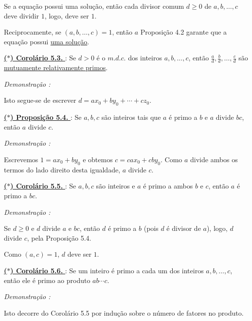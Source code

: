 Se a equação possui uma solução, então cada divisor comum $d \ge 0$ de $a, b, \ldots, c$ deve
dividir $1$, logo, deve ser $1$.

Reciprocamente, se $(a, b, \ldots , c) = 1$, então $a$ Proposição 4.2 
garante que a equação possui \underline{uma solução}.

\vspace{0.2cm}
\noindent\underline{\underline{\textbf{($\ast$) Corolário 5.3. }}} : Se $d > 0$ é o $m.d.c.$ dos inteiros 
$a, b, \ldots, c$, então $\tfrac{a}{d}, \tfrac{b}{d}, \ldots, \tfrac{c}{d}$ 
são \underline{mutuamente relativamente primos}.

\vspace{0.2cm}
\noindent\textit{Demonstração : }

Isto segue-se de escrever $d = ax_0 + by_0 + \cdots + cz_0$.

\vspace{0.2cm}
\noindent\underline{\underline{\textbf{($\ast$) Proposição 5.4. }}} : Se $a, b, c$ são inteiros tais que $a$ é primo a $b$ e $a$ divide $bc$, então $a$ divide $c$.

\vspace{0.2cm}
\noindent\textit{Demonstração : }

Escrevemos $1 = ax_0 + by_0$ e obtemos $c = cax_0 + cby_0$.  
Como $a$ divide ambos os termos do lado direito desta igualdade, $a$ divide $c$.

\vspace{0.2cm}
\noindent\underline{\underline{\textbf{($\ast$) Corolário 5.5. }}} : Se $a, b, c$ são inteiros e $a$ é primo a ambos $b$ e $c$, então $a$ é primo a $bc$.

\vspace{0.2cm}
\noindent\textit{Demonstração : }

Se $d \ge 0$ e $d$ divide $a$ e $bc$, então $d$ é primo a $b$ (pois $d$ é divisor de $a$), 
logo, $d$ divide $c$, pela Proposição 5.4.

Como $(a, c) = 1$, $d$ deve ser $1$.

\vspace{0.2cm}
\noindent\underline{\underline{\textbf{($\ast$) Corolário 5.6. }}} : Se um inteiro é primo a cada um dos inteiros $a, b, \ldots, c$, então ele é primo ao produto $ab \cdots c$.

\vspace{0.2cm}
\noindent\textit{Demonstração : }

Isto decorre do Corolário 5.5 por indução sobre o número de fatores no produto.

